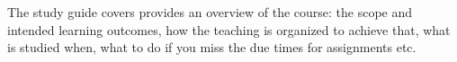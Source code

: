 The study guide covers provides an overview of the course:
the scope and intended learning outcomes, how the teaching is organized to 
achieve that, what is studied when, what to do if you miss the due times for 
assignments etc. 
